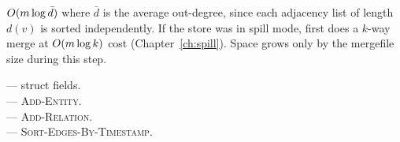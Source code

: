 \begin{complexity}
$O(m \log \bar d)$ where $\bar d$ is the average out-degree, since
each adjacency list of length $d(v)$ is sorted independently. If the
store was in spill mode,  first does a $k$-way merge
at $O(m \log k)$ cost (Chapter~\ref{ch:spill}). Space grows only
by the mergefile size during this step.
\end{complexity}

\begin{inthecode}
 --- struct fields.\\
 --- \textsc{Add-Entity}.\\
 --- \textsc{Add-Relation}.\\
 --- \textsc{Sort-Edges-By-Timestamp}.
\end{inthecode}
